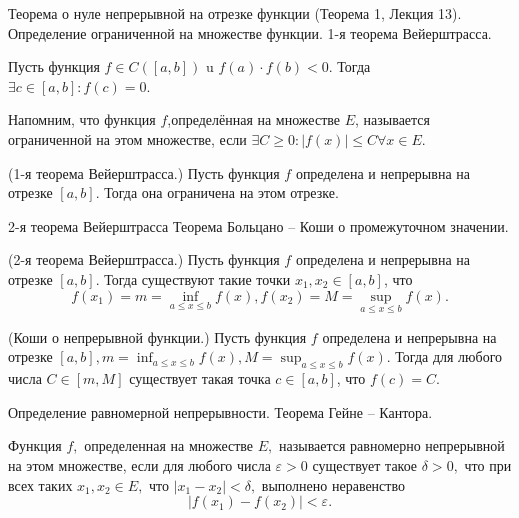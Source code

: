 \newpage
\begin{problem}
Теорема о нуле непрерывной на отрезке функции (Теорема 1, Лекция 13). Определение
ограниченной на множестве функции. 1-я теорема Вейерштрасса.
\end{problem}
\begin{theorem}
    Пусть функция $f \in C([a, b])$ u $f(a) \cdot f(b)<0$. Тогда $\exists c \in[a, b]: f(c)=0$.

    Напомним, что функция $f$,определённая на множестве $E$, называется ограниченной на этом множестве, если $\exists C \geq 0:|f(x)| \leq C \forall x \in E$.
\end{theorem}

\begin{theorem}
    (1-я теорема Вейерштрасса.) Пусть функция $f$ определена и непрерывна на отрезке $[a, b]$. Тогда она ограничена на этом отрезке.
\end{theorem}

\newpage
\begin{problem}
2-я теорема Вейерштрасса Теорема Больцано – Коши о промежуточном значении.
\end{problem}
\begin{theorem}
    (2-я теорема Вейерштрасса.) Пусть функция $f$ определена и непрерывна на отрезке $[a, b]$. Тогда существуют такие точки $x_1, x_2 \in[a, b]$, что
    $$
        f\left(x_1\right)=m=\inf _{a \leq x \leq b} f(x), f\left(x_2\right)=M=\sup _{a \leq x \leq b} f(x) .
    $$
\end{theorem}

\begin{theorem}
    (Коши о непрерывной функции.) Пусть функция $f$ определена и непрерывна на отрезке $[a, b], m=\inf _{a \leq x \leq b} f(x), M=\sup _{a \leq x \leq b} f(x)$. Тогда для любого числа $C \in[m, M]$ существует такая точка $c \in[a, b]$, что $f(c)=C$.
\end{theorem}

\newpage
\begin{problem}
Определение равномерной непрерывности. Теорема Гейне – Кантора.
\end{problem}

\begin{definition}
    Функция $f,$ определенная на множестве $E,$
    называется равномерно непрерывной на этом множестве,
    если для любого числа $\varepsilon>0$ существует
    такое $\delta>0,$ что при всех таких
    $x_1, x_2\in E,$ что $|x_1-x_2|<\delta,$ выполнено
    неравенство
    $$
        |f(x_1)-f(x_2)|<\varepsilon.
    $$
\end{definition}


